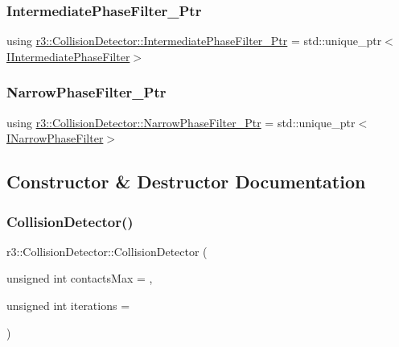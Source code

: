 \subsubsection{\texorpdfstring{Intermediate\+Phase\+Filter\+\_\+\+Ptr}{IntermediatePhaseFilter\_Ptr}}
{\footnotesize\ttfamily using \mbox{\hyperlink{classr3_1_1_collision_detector_a8337c2c23ec77350b65977e043c07827}{r3\+::\+Collision\+Detector\+::\+Intermediate\+Phase\+Filter\+\_\+\+Ptr}} =  std\+::unique\+\_\+ptr$<$\mbox{\hyperlink{classr3_1_1_i_intermediate_phase_filter}{I\+Intermediate\+Phase\+Filter}}$>$}

\mbox{\label{classr3_1_1_collision_detector_a094cc287cba14d5a063cfca41e667008}} 
\subsubsection{\texorpdfstring{Narrow\+Phase\+Filter\+\_\+\+Ptr}{NarrowPhaseFilter\_Ptr}}
{\footnotesize\ttfamily using \mbox{\hyperlink{classr3_1_1_collision_detector_a094cc287cba14d5a063cfca41e667008}{r3\+::\+Collision\+Detector\+::\+Narrow\+Phase\+Filter\+\_\+\+Ptr}} =  std\+::unique\+\_\+ptr$<$\mbox{\hyperlink{classr3_1_1_i_narrow_phase_filter}{I\+Narrow\+Phase\+Filter}}$>$}



\subsection{Constructor \& Destructor Documentation}
\mbox{\label{classr3_1_1_collision_detector_ad5754f8b7105f7d0c2a534bee681cd6d}} 
\subsubsection{\texorpdfstring{Collision\+Detector()}{CollisionDetector()}\hspace{0.1cm}{\footnotesize\ttfamily [1/2]}}
{\footnotesize\ttfamily r3\+::\+Collision\+Detector\+::\+Collision\+Detector (\begin{DoxyParamCaption}\item[{unsigned int}]{contacts\+Max = {},  }\item[{unsigned int}]{iterations = {} }\end{DoxyParamCaption})\hspace{0.3cm}{\ttfamily [explicit]}}

